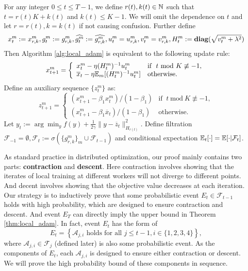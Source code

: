 \documentclass{article} %
\numberwithin{equation}{section}
\begin{document}
    For any integer $0\leq t\leq T-1$, we define $r(t),k(t)\in\mathbb{N}$ such that $t=r(t)K+k(t)$ and $k(t)\leq K-1$. We will omit the dependence on $t$ and let $r=r(t),k=k(t)$ if not causing confusion. Further define 
    \begin{equation}
        x_t^m:=x_{r,k}^m, g_t^m:=g_{r,k}^m, \widehat{g_t^m}:=\widehat{g_{r,k}^m}, u_t^m=u_{r,k}^m, v_t^m=v_{r,k}^m, H_t^m:=\mbox{\bf diag}(\sqrt{v_t^m+\lambda^2})
    \end{equation} 
    Then Algorithm \ref{alg:local_adam} is equivalent to the following update rule:
    \begin{equation}
        x_{t+1}^m = \left\{
        \begin{array}{ll}
            x_t^m-\eta (H_t^m)^{-1}u_t^m & \text{if $\ t\ \text{mod}\ K \not\equiv -1$}, \\
            \overline{x}_t-\eta\expect_m[(H_t^m)^{-1}u_t^m] & \text{otherwise}.
        \end{array}
        \right.
    \end{equation}
    Define an auxiliary sequence $\{z_t^m\}$ as:
    \begin{equation}\label{eq:def_zt}
        z_{t+1}^m = \left\{
        \begin{array}{ll}
            (x_{t+1}^m-\beta_1x_t^m)/(1-\beta_1) & \text{if $\ t\ \text{mod}\ K \not\equiv -1$}, \\
            (x_{t+1}^m-\beta_1\overline{x}_t)/(1-\beta_1) & \text{otherwise}.
        \end{array}
        \right.
    \end{equation}
    Let $y_t:= \arg\min_y f(y) + \frac{1}{2\gamma}\|y-\overline{z}_t\|_{H_{r(t)}}^2 $.
    Define filtration $\mathcal{F}_{-1}=\emptyset, \mathcal{F}_t:=\sigma(\{g_{r,k}^m\}_m \cup \mathcal{F}_{t-1})$ and conditional expectation $\mathbb{E}_t[\cdot]=\mathbb{E}[\cdot|\mathcal{F}_t]$.

    As standard practice in distributed optimization, our proof mainly contains two parts: \textbf{contraction} and \textbf{descent}. 
    Here contraction involves showing that the iterates of local training at different workers will not diverge to different points. And decent involves showing that the objective value decreases at each iteration.
    Our strategy is to inductively prove that some probabilistic event $E_t\in \mathcal{F}_{t-1}$ holds with high probability, which are designed to ensure  contraction and descent. 
    And event $E_T$ can directly imply the upper bound in Theorem \ref{thm:local_adam}.  
    In fact, event $E_t$ has the form of
    \begin{equation}
        E_t= \left\{\mathcal{A}_{j,i} \text{ holds for all }j\leq t-1, i\in\{1,2,3,4\} \right\},
    \end{equation}
    where $\mathcal{A}_{j,i}\in \mathcal{F}_j$ (defined later) is also some probabilistic event.  
    As the components of $E_t$, each $\mathcal{A}_{j,i}$ is designed to ensure either contraction or descent.
    We will prove the high probability bound of these components in sequence. 
\end{document}
